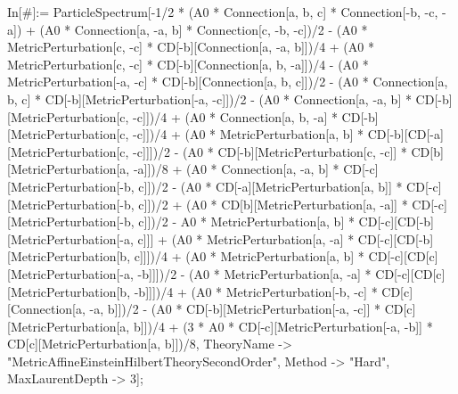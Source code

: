 In[#]:= ParticleSpectrum[-1/2 * (A0 * Connection[a, b, c] * Connection[-b, -c, -a]) + (A0 * Connection[a, -a, b] * Connection[c, -b, -c])/2 - (A0 * MetricPerturbation[c, -c] * CD[-b][Connection[a, -a, b]])/4 + (A0 * MetricPerturbation[c, -c] * CD[-b][Connection[a, b, -a]])/4 - (A0 * MetricPerturbation[-a, -c] * CD[-b][Connection[a, b, c]])/2 - (A0 * Connection[a, b, c] * CD[-b][MetricPerturbation[-a, -c]])/2 - (A0 * Connection[a, -a, b] * CD[-b][MetricPerturbation[c, -c]])/4 + (A0 * Connection[a, b, -a] * CD[-b][MetricPerturbation[c, -c]])/4 + (A0 * MetricPerturbation[a, b] * CD[-b][CD[-a][MetricPerturbation[c, -c]]])/2 - (A0 * CD[-b][MetricPerturbation[c, -c]] * CD[b][MetricPerturbation[a, -a]])/8 + (A0 * Connection[a, -a, b] * CD[-c][MetricPerturbation[-b, c]])/2 - (A0 * CD[-a][MetricPerturbation[a, b]] * CD[-c][MetricPerturbation[-b, c]])/2 + (A0 * CD[b][MetricPerturbation[a, -a]] * CD[-c][MetricPerturbation[-b, c]])/2 - A0 * MetricPerturbation[a, b] * CD[-c][CD[-b][MetricPerturbation[-a, c]]] + (A0 * MetricPerturbation[a, -a] * CD[-c][CD[-b][MetricPerturbation[b, c]]])/4 + (A0 * MetricPerturbation[a, b] * CD[-c][CD[c][MetricPerturbation[-a, -b]]])/2 - (A0 * MetricPerturbation[a, -a] * CD[-c][CD[c][MetricPerturbation[b, -b]]])/4 + (A0 * MetricPerturbation[-b, -c] * CD[c][Connection[a, -a, b]])/2 - (A0 * CD[-b][MetricPerturbation[-a, -c]] * CD[c][MetricPerturbation[a, b]])/4 + (3 * A0 * CD[-c][MetricPerturbation[-a, -b]] * CD[c][MetricPerturbation[a, b]])/8, TheoryName -> "MetricAffineEinsteinHilbertTheorySecondOrder", Method -> "Hard", MaxLaurentDepth -> 3]; 